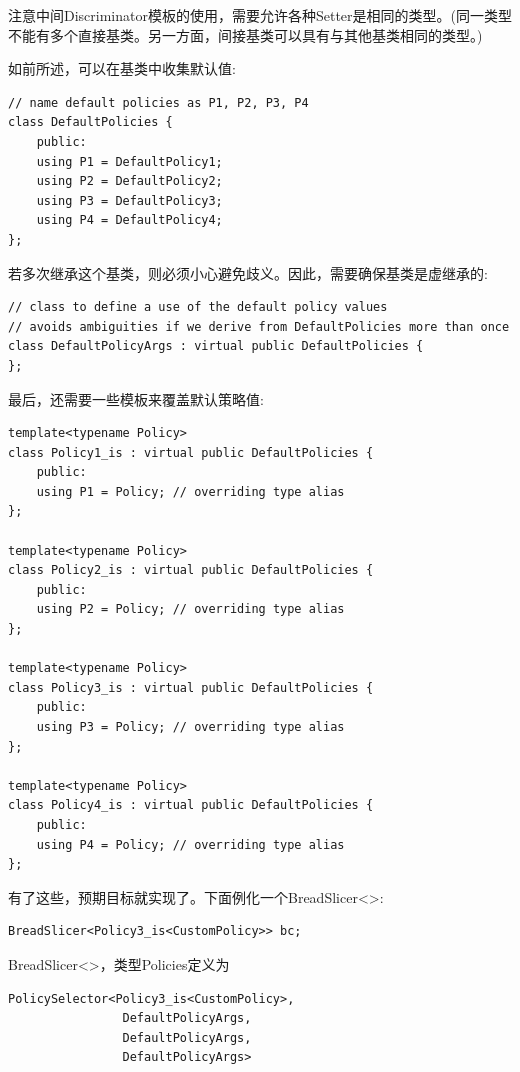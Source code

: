 注意中间Discriminator模板的使用，需要允许各种Setter是相同的类型。(同一类型不能有多个直接基类。另一方面，间接基类可以具有与其他基类相同的类型。)

如前所述，可以在基类中收集默认值:

\begin{lstlisting}[style=styleCXX]
// name default policies as P1, P2, P3, P4
class DefaultPolicies {
	public:
	using P1 = DefaultPolicy1;
	using P2 = DefaultPolicy2;
	using P3 = DefaultPolicy3;
	using P4 = DefaultPolicy4;
};
\end{lstlisting}

若多次继承这个基类，则必须小心避免歧义。因此，需要确保基类是虚继承的:

\begin{lstlisting}[style=styleCXX]
// class to define a use of the default policy values
// avoids ambiguities if we derive from DefaultPolicies more than once
class DefaultPolicyArgs : virtual public DefaultPolicies {
};
\end{lstlisting}

最后，还需要一些模板来覆盖默认策略值:

\begin{lstlisting}[style=styleCXX]
template<typename Policy>
class Policy1_is : virtual public DefaultPolicies {
	public:
	using P1 = Policy; // overriding type alias
};

template<typename Policy>
class Policy2_is : virtual public DefaultPolicies {
	public:
	using P2 = Policy; // overriding type alias
};

template<typename Policy>
class Policy3_is : virtual public DefaultPolicies {
	public:
	using P3 = Policy; // overriding type alias
};

template<typename Policy>
class Policy4_is : virtual public DefaultPolicies {
	public:
	using P4 = Policy; // overriding type alias
};
\end{lstlisting}

有了这些，预期目标就实现了。下面例化一个BreadSlicer<>:

\begin{lstlisting}[style=styleCXX]
BreadSlicer<Policy3_is<CustomPolicy>> bc;
\end{lstlisting}

BreadSlicer<>，类型Policies定义为

\begin{lstlisting}[style=styleCXX]
PolicySelector<Policy3_is<CustomPolicy>,
				DefaultPolicyArgs,
				DefaultPolicyArgs,
				DefaultPolicyArgs>
\end{lstlisting}

